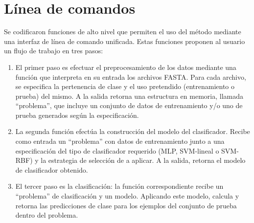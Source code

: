 %
%
%
\section{Línea de comandos}
%
Se codificaron funciones de alto nivel que permiten el uso del método
mediante una interfaz de línea de comando unificada.
Estas funciones proponen al usuario un flujo de trabajo en tres pasos:
%
\begin{enumerate}
\item
  El primer paso es efectuar el preprocesamiento de los datos mediante
  una función que interpreta en su entrada los archivos FASTA.
  Para cada archivo, se especifica la pertenencia de clase y el uso
  pretendido (entrenamiento o prueba) del mismo.
  A la salida retorna una estructura en memoria, llamada ``problema'',
  que incluye un conjunto de datos de entrenamiento y/o uno de prueba
  generados según la especificación.
\item
  La segunda función efectúa la construcción del modelo del
  clasificador.
  Recibe como entrada un ``problema'' con datos de entrenamiento junto
  a una especificación del tipo de clasificador requerido (MLP,
  SVM-lineal o SVM-RBF) y la estrategia de selección de  a
  aplicar.
  A la salida, retorna el modelo de clasificador obtenido.
\item
  El tercer paso es la clasificación: la función correspondiente
  recibe un ``problema'' de clasificación y un modelo.
  Aplicando este modelo, calcula y retorna las predicciones de clase
  para los ejemplos del conjunto de prueba dentro del problema.
\end{enumerate}
%
